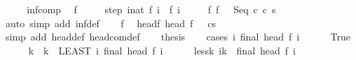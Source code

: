 \begin{isabellebody}
%
\isadelimproof
%
\endisadelimproof
%
\isatagproof
{}\isamarkupfalse%
\ {\isacharminus}\isanewline
\ \ \isamarkupfalse%
\ inf{\isacharunderscore}comp\ \isamarkupfalse%
\ f\ \isanewline
\ \ \ \ step{\isacharcolon}\ {\isachardoublequoteopen}{\isasymforall}i{\isacharcolon}{\isacharcolon}nat{\isachardot}\ {\isasymGamma}{\isasymturnstile}f\ i\ {\isasymrightarrow}\ f\ {\isacharparenleft}i{\isacharplus}{}{\isacharparenright}{\isachardoublequoteclose}\ \isanewline
\ \ \ \ f{\isacharunderscore}{}{\isacharcolon}\ {\isachardoublequoteopen}f\ {}\ {\isacharequal}\ {\isacharparenleft}Seq\ c\ c\ s{\isacharparenright}{\isachardoublequoteclose}\isanewline
\ \ \ \ \isamarkupfalse%
\ {\isacharparenleft}auto\ simp\ add{\isacharcolon}\ inf{\isacharunderscore}def{\isacharparenright}\isanewline
\ \ \isamarkupfalse%
\ f{\isacharunderscore}{}\ \isamarkupfalse%
\ head{\isacharunderscore}f{\isacharunderscore}{}{\isacharcolon}\ {\isachardoublequoteopen}head\ {\isacharparenleft}f\ {}{\isacharparenright}\ {\isacharequal}\ {\isacharparenleft}cs{\isacharparenright}{\isachardoublequoteclose}\ \isanewline
\ \ \ \ \isamarkupfalse%
\ {\isacharparenleft}simp\ add{\isacharcolon}\ head{\isacharunderscore}def\ head{\isacharunderscore}com{\isacharunderscore}def{\isacharparenright}\isanewline
\ \ \isamarkupfalse%
\ {\isacharquery}thesis\isanewline
\ \ \isamarkupfalse%
\ {\isacharparenleft}cases\ {\isachardoublequoteopen}{\isasymexists}i{\isachardot}\ final\ {\isacharparenleft}head\ {\isacharparenleft}f\ i{\isacharparenright}{\isacharparenright}{\isachardoublequoteclose}{\isacharparenright}\isanewline
\ \ \ \ \isamarkupfalse%
\ True\isanewline
\ \ \ \ \isamarkupfalse%
\ k\ \ {\isachardoublequoteopen}k\ {\isacharequal}\ {\isacharparenleft}LEAST\ i{\isachardot}\ final\ {\isacharparenleft}head\ {\isacharparenleft}f\ i{\isacharparenright}{\isacharparenright}{\isacharparenright}{\isachardoublequoteclose}\isanewline
\ \ \ \ \isamarkupfalse%
\ less{\isacharunderscore}k{\isacharcolon}\ {\isachardoublequoteopen}{\isasymforall}i{\isacharless}k{\isachardot}\ {\isasymnot}\ final\ {\isacharparenleft}head\ {\isacharparenleft}f\ i{\isacharparenright}{\isacharparenright}{\isachardoublequoteclose}\isanewline

\end{isabellebody}
